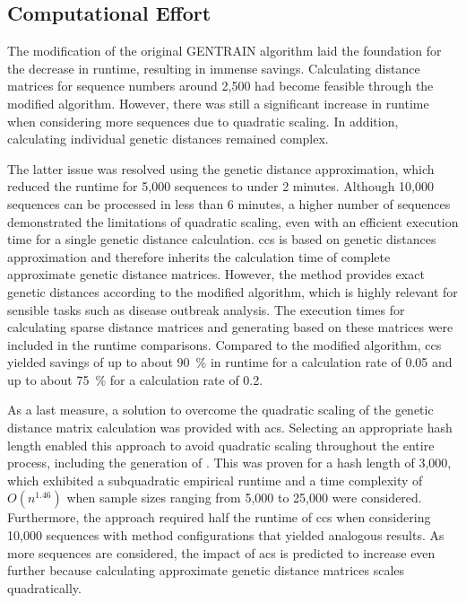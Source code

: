 \subsection{Computational Effort}
The modification of the original GENTRAIN algorithm laid the foundation for the decrease in runtime, resulting in immense savings. Calculating distance matrices for sequence numbers around 2,500 had become feasible through the modified algorithm. However, there was still a significant increase in runtime when considering more sequences due to quadratic scaling. In addition, calculating individual genetic distances remained complex.

The latter issue was resolved using the genetic distance approximation, which reduced the runtime for 5,000 sequences to under 2 minutes. Although 10,000 sequences can be processed in less than 6 minutes, a higher number of sequences demonstrated the limitations of quadratic scaling, even with an efficient execution time for a single genetic distance calculation. \acrshort{ccs} is based on genetic distances approximation and therefore inherits the calculation time of complete approximate genetic distance matrices. However, the method provides exact genetic distances according to the modified algorithm, which is highly relevant for sensible tasks such as disease outbreak analysis. The execution times for calculating sparse distance matrices and generating  based on these matrices were included in the runtime comparisons. Compared to the modified algorithm, \acrshort{ccs} yielded savings of up to about 90~\% in runtime for a calculation rate of 0.05 and up to about 75~\% for a calculation rate of 0.2.

As a last measure, a solution to overcome the quadratic scaling of the genetic distance matrix calculation was provided with \acrshort{acs}. Selecting an appropriate hash length enabled this approach to avoid quadratic scaling throughout the entire process, including the generation of . This was proven for a hash length of 3,000, which exhibited a subquadratic empirical runtime and a time complexity of $O(n^{1.46})$ when sample sizes ranging from 5,000 to 25,000 were considered. Furthermore, the approach required half the runtime of \acrshort{ccs} when considering 10,000 sequences with method configurations that yielded analogous results. As more sequences are considered, the impact of \acrshort{acs} is predicted to increase even further because calculating approximate genetic distance matrices scales quadratically.

